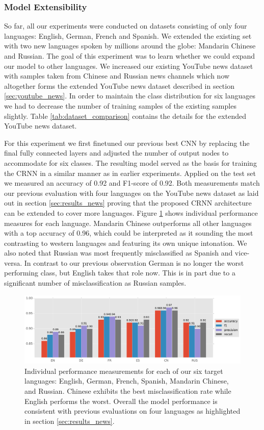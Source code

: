 \subsubsection{Model Extensibility} 
\label{sec:extensibility}
So far, all our experiments were conducted on datasets consisting of only four languages: English, German, French and Spanish. We extended the existing set with two new languages spoken by millions around the globe: Mandarin Chinese and Russian. The goal of this experiment was to learn whether we could expand our model to other languages. 
We increased our existing YouTube news dataset with samples taken from Chinese and Russian news channels which now altogether forms the extended YouTube news dataset described in section \ref{sec:youtube_news}. In order to maintain the class distribution for six languages we had to decrease the number of training samples of the existing samples slightly. Table \ref{tab:dataset_comparison} contains the details for the extended YouTube news dataset.

For this experiment we first finetuned our previous best CNN by replacing the final fully connected layers and adjusted the number of output nodes to accommodate for six classes. The resulting model served as the basis for training the CRNN in a similar manner as in earlier experiments. Applied on the test set we measured an accuracy of 0.92 and F1-score of 0.92. Both measurements match our previous evaluation with four languages on the YouTube news dataset as laid out in section \ref{sec:results_news} proving that the proposed CRNN architecture can be extended to cover more languages. Figure \ref{fig:6lang} shows individual performance measures for each language. Mandarin Chinese outperforms all other languages with a top accuracy of 0.96, which could be interpreted as it sounding the most contrasting to western languages and featuring its own unique intonation. We also noted that Russian was most frequently misclassified as Spanish and vice-versa. In contrast to our previous observation German is no longer the worst performing class, but English takes that role now. This is in part due to a significant number of misclassification as Russian samples.

	\begin{figure}[]
  		\centering
    	\includegraphics[width=\textwidth, keepaspectratio]{plots/results_6lang_plot.pdf}
    	\caption{Individual performance measurements for each of our six target languages: English, German, French, Spanish, Mandarin Chinese, and Russian. Chinese exhibits the best misclassification rate while English performs the worst. Overall the model performance is consistent with previous evaluations on four languages as highlighted in section \ref{sec:results_news}.}
    	\label{fig:6lang}
	\end{figure}

